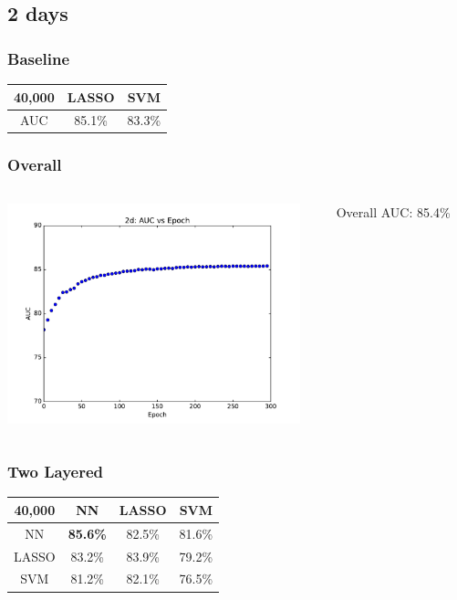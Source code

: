 \documentclass[table]{beamer}
\begin{document}

\subsection{2 days}

\begin{frame}
	\frametitle{Baseline}
	\begin{center}
		\begin{tabular}{c | c c}
			40,000 & LASSO & SVM \\ \hline
			AUC & 85.1\% & 83.3\% \\
		\end{tabular}
	\end{center}
\end{frame}

\begin{frame}
	\frametitle{Overall}
	\begin{columns}[c]
		\begin{column}{8cm}
			\includegraphics[width=8.5cm]{Images/NNplots/2d.pdf}
		\end{column}
		\begin{column}{4cm}
			Overall AUC: 85.4\%
		\end{column}
		
	\end{columns}
\end{frame}

\begin{frame}
	\frametitle{Two Layered}
	\begin{center}
		\begin{tabular}{c | c c c}
			40,000 & NN & LASSO & SVM \\ \hline
			NN & \textbf{85.6\%} & 82.5\% & 81.6\% \\
			LASSO & 83.2\% & 83.9\% & 79.2\% \\
			SVM & 81.2\% & 82.1\% & 76.5\%
		\end{tabular}
	
	\end{center}
\end{frame}
\end{document}
